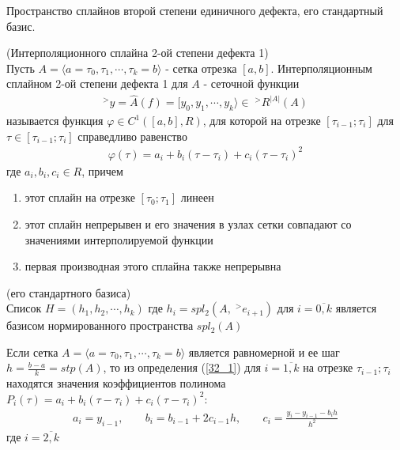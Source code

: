 \documentclass[__main__.tex]{subfiles}
\begin{document}
	Пространство сплайнов второй степени единичного дефекта, его стандартный базис.
	\begin{definition}
		\label{32_1}
		(Интерполяционного сплайна 2-ой степени дефекта 1)\\
		Пусть $A = \langle a = \tau_0,\tau_1,\cdots, \tau_k = b\rangle$ - сетка отрезка $[a,b]$. Интерполяционным сплайном 2-ой степени дефекта 1 для $A$ - сеточной функции 
		\begin{gather*}
			^>y = \hat{A}(f) = [y_0, y_1, \cdots, y_k \rangle \in \; ^>R^{|A|}(A)
		\end{gather*}
		называется функция $\varphi \in C^1\left([a,b], R\right)$, для которой на отрезке $[\tau_{i-1}; \tau_i]$ для $\tau \in [\tau_{i-1}; \tau_i]$ справедливо равенство 
		\begin{gather*}
			\varphi(\tau) = a_i+b_i(\tau - \tau_i)+c_i(\tau - \tau_i)^2
		\end{gather*}
		где $a_i,b_i,c_i \in R$, причем
		\begin{enumerate}
			\item этот сплайн на отрезке $[\tau_0;\tau_1]$ линеен
			\item этот сплайн непрерывен и его значения в узлах сетки совпадают со значениями интерполируемой функции
			\item первая производная этого сплайна также непрерывна
		\end{enumerate}
	\end{definition}
	\begin{definition}
		(его стандартного базиса)\\
		Список $H = (h_1,h_2,\cdots, h_k)$ где $h_i = spl_2(A,\; ^>e_{i+1})$ для $i=\overline{0,k}$ является базисом нормированного пространства $spl_2(A)$
	\end{definition}
	Если сетка $A = \langle a=\tau_0, \tau_1,\cdots,\tau_k = b \rangle$ является равномерной и ее шаг $h = \frac{b-a}{k} = stp(A)$, то из определения (\ref{32_1}) для $i = \overline{1,k}$  на отрезке $\tau_{i-1};\tau_i$ находятся значения коэффициентов полинома $P_i(\tau) = a_i+b_i(\tau-\tau_i)+c_i(\tau-\tau_i)^2$:
	\begin{gather*}
		a_i = y_{i-1},\;\;\;\;\;\;\;b_i = b_{i-1}+2c_{i-1}h,\;\;\;\;\;\;\;c_i = \frac{y_i-y_{i-1}-b_ih}{h^2}
	\end{gather*}
	где $i=\overline{2,k}$
\end{document}
